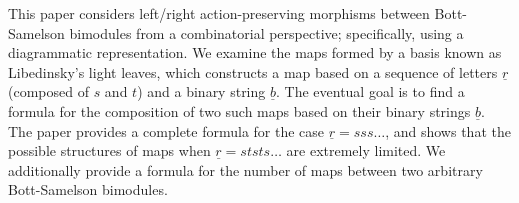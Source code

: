 
This paper considers left/right action-preserving morphisms between Bott-Samelson bimodules from a combinatorial perspective; specifically, using a diagrammatic representation.  We examine the maps formed by a basis known as Libedinsky's light leaves, which constructs a map based on a sequence of letters $\underline r$ (composed of $s$ and $t$) and a binary string $\underline b$.  The eventual goal is to find a formula for the composition of two such maps based on their binary strings $\underline b$.  The paper provides a complete formula for the case $\underline r = sss\dots$, and shows that the possible structures of maps when $\underline r = ststs\dots$ are extremely limited.  We additionally provide a formula for the number of maps between two arbitrary Bott-Samelson bimodules.
